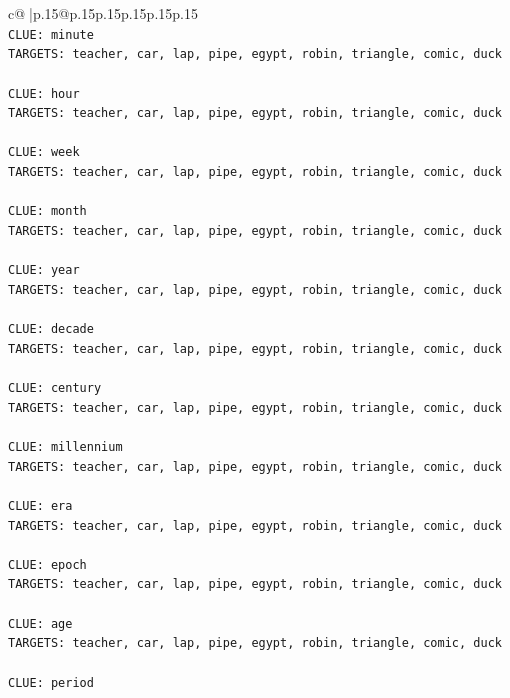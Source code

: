 \documentclass{article}
\begin{document}
{\begin{supertabular}{c@{$\;$}|p{.15\linewidth}@{}p{.15\linewidth}p{.15\linewidth}p{.15\linewidth}p{.15\linewidth}p{.15\linewidth}}
{{{\\ 
\texttt{CLUE: minute} \\
\texttt{TARGETS: teacher, car, lap, pipe, egypt, robin, triangle, comic, duck} \\
\\ 
\texttt{CLUE: hour} \\
\texttt{TARGETS: teacher, car, lap, pipe, egypt, robin, triangle, comic, duck} \\
\\ 
\texttt{CLUE: week} \\
\texttt{TARGETS: teacher, car, lap, pipe, egypt, robin, triangle, comic, duck} \\
\\ 
\texttt{CLUE: month} \\
\texttt{TARGETS: teacher, car, lap, pipe, egypt, robin, triangle, comic, duck} \\
\\ 
\texttt{CLUE: year} \\
\texttt{TARGETS: teacher, car, lap, pipe, egypt, robin, triangle, comic, duck} \\
\\ 
\texttt{CLUE: decade} \\
\texttt{TARGETS: teacher, car, lap, pipe, egypt, robin, triangle, comic, duck} \\
\\ 
\texttt{CLUE: century} \\
\texttt{TARGETS: teacher, car, lap, pipe, egypt, robin, triangle, comic, duck} \\
\\ 
\texttt{CLUE: millennium} \\
\texttt{TARGETS: teacher, car, lap, pipe, egypt, robin, triangle, comic, duck} \\
\\ 
\texttt{CLUE: era} \\
\texttt{TARGETS: teacher, car, lap, pipe, egypt, robin, triangle, comic, duck} \\
\\ 
\texttt{CLUE: epoch} \\
\texttt{TARGETS: teacher, car, lap, pipe, egypt, robin, triangle, comic, duck} \\
\\ 
\texttt{CLUE: age} \\
\texttt{TARGETS: teacher, car, lap, pipe, egypt, robin, triangle, comic, duck} \\
\\ 
\texttt{CLUE: period} \\
}}}
\end{supertabular}}
\end{document}
